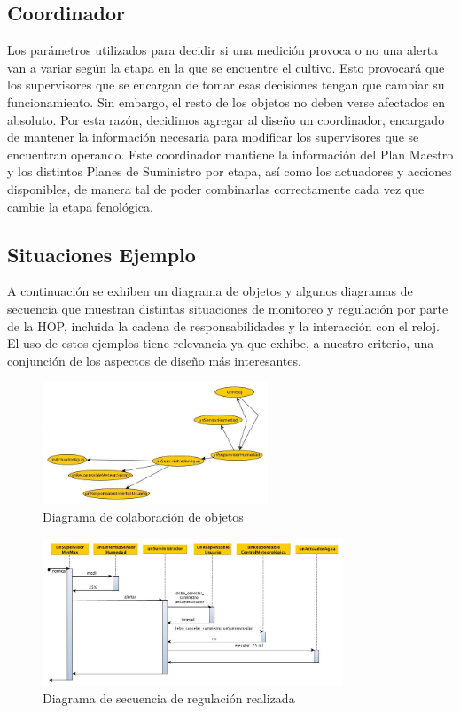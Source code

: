 \subsection{Coordinador}
Los parámetros utilizados para decidir si una medición provoca o no una alerta van a variar según la etapa en la que se encuentre el cultivo. Esto provocará que los supervisores que se encargan de tomar esas decisiones tengan que cambiar su funcionamiento. Sin embargo, el resto de los objetos no deben verse afectados en absoluto. Por esta razón, decidimos agregar al diseño un coordinador, encargado de mantener la información necesaria para modificar los supervisores que se encuentran operando. Este coordinador mantiene la información del Plan Maestro y los distintos Planes de Suministro por etapa, así como los actuadores y acciones disponibles, de manera tal de poder combinarlas correctamente cada vez que cambie la etapa fenológica.

\clearpage 

\subsection{Situaciones Ejemplo}

A continuación se exhiben un diagrama de objetos y  algunos diagramas de secuencia que muestran distintas situaciones de monitoreo y regulación por parte de la HOP, incluida la cadena de responsabilidades y la interacción con el reloj. El uso de estos ejemplos tiene relevancia ya que exhibe, a nuestro criterio, una conjunción de los aspectos de diseño más interesantes. 

\begin{figure}[h!]
  \centering
  \includegraphics[width=0.6\textwidth]{./imagenes/objetosCoordinador.jpg}
  \caption{Diagrama de colaboración de objetos}
  \label{fig:sec_sum1}
\end{figure}

\begin{figure}[h!]
  \centering
  \includegraphics[width=0.8\textwidth]{./imagenes/secuencia_suministro1.jpg}
  \caption{Diagrama de secuencia de regulación realizada}
  \label{fig:sec_sum1}
\end{figure}

